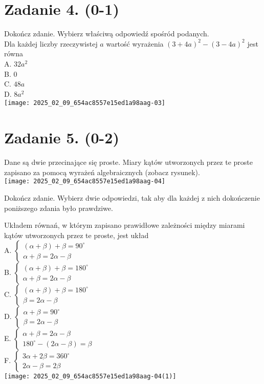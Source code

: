\documentclass[10pt]{article}
\begin{document}
\section*{Zadanie 4. (0-1)}
Dokończ zdanie. Wybierz właściwą odpowiedź spośród podanych.\\
Dla każdej liczby rzeczywistej \(a\) wartość wyrażenia \((3+4 a)^{2}-(3-4 a)^{2}\) jest równa\\
A. \(32 a^{2}\)\\
B. 0\\
C. \(48 a\)\\
D. \(8 a^{2}\)\\
\texttt{[image: 2025\_02\_09\_654ac8557e15ed1a98aag-03]}

\section*{Zadanie 5. (0-2)}
Dane są dwie przecinające się proste. Miary kątów utworzonych przez te proste zapisano za pomocą wyrażeń algebraicznych (zobacz rysunek).\\
\texttt{[image: 2025\_02\_09\_654ac8557e15ed1a98aag-04]}

Dokończ zdanie. Wybierz dwie odpowiedzi, tak aby dla każdej z nich dokończenie poniższego zdania było prawdziwe.

Układem równań, w którym zapisano prawidłowe zależności między miarami kątów utworzonych przez te proste, jest układ\\
A. \(\left\{\begin{array}{l}(\alpha+\beta)+\beta=90^{\circ} \\ \alpha+\beta=2 \alpha-\beta\end{array}\right.\)\\
B. \(\left\{\begin{array}{l}(\alpha+\beta)+\beta=180^{\circ} \\ \alpha+\beta=2 \alpha-\beta\end{array}\right.\)\\
C. \(\left\{\begin{array}{l}(\alpha+\beta)+\beta=180^{\circ} \\ \beta=2 \alpha-\beta\end{array}\right.\)\\
D. \(\left\{\begin{array}{l}\alpha+\beta=90^{\circ} \\ \beta=2 \alpha-\beta\end{array}\right.\)\\
E. \(\left\{\begin{array}{l}\alpha+\beta=2 \alpha-\beta \\ 180^{\circ}-(2 \alpha-\beta)=\beta\end{array}\right.\)\\
F. \(\left\{\begin{array}{l}3 \alpha+2 \beta=360^{\circ} \\ 2 \alpha-\beta=2 \beta\end{array}\right.\)\\
\texttt{[image: 2025\_02\_09\_654ac8557e15ed1a98aag-04(1)]}
\end{document}
